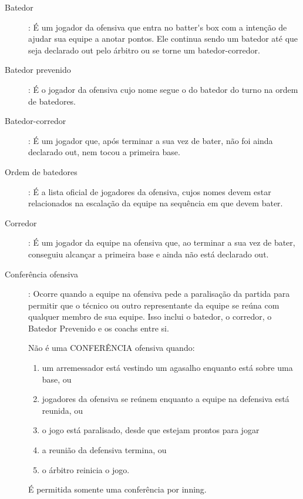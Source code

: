 	\begin{description}
	\item[Batedor]: \'E um jogador da ofensiva que entra no \gls{batter's box} com a inten\c{c}\~ao de ajudar sua equipe a anotar pontos. Ele continua sendo um batedor at\'e que seja declarado \gls{out} pelo \'arbitro ou se torne um batedor-corredor. 
	\item[Batedor prevenido]: \'E o jogador da ofensiva cujo nome segue o do batedor do turno na ordem de batedores. 	
	\item[Batedor-corredor]: \'E um jogador que, ap\'os terminar a sua vez de bater, n\~ao foi ainda declarado \gls{out}, nem tocou a primeira base. 
	
	\item[Ordem de batedores]: \'E a lista oficial de jogadores da ofensiva, cujos nomes devem estar relacionados na escala\c{c}\~ao da equipe na sequ\^encia em que devem bater. 
	
		\item[Corredor]: \'E um jogador da equipe na ofensiva que, ao terminar a sua vez de bater, conseguiu alcan\c{c}ar a primeira base e ainda n\~ao est\'a declarado \gls{out}.

	\item[Confer\^encia ofensiva]: Ocorre quando a equipe na ofensiva pede a paralisa\c{c}\~ao da partida para permitir que o t\'ecnico ou outro representante da equipe se re\'una com qualquer membro de sua equipe. Isso inclui o batedor, o corredor, o Batedor Prevenido e os \glspl{coach} entre si. 
	
	N\~ao \'e uma CONFERÊNCIA ofensiva quando:
	\begin{enumerate}[label=\alph*)]
		\item  um arremessador est\'a vestindo um agasalho enquanto est\'a sobre uma base, ou
		\item jogadores da ofensiva se re\'unem enquanto a equipe na defensiva est\'a reunida, ou 
		\item o jogo est\'a paralisado, desde que estejam prontos para jogar
		\item a reuni\~ao da defensiva termina, ou 
		\item o \'arbitro reinicia o jogo. 
	\end{enumerate}
		\'E permitida somente uma confer\^encia por \gls{inning}. 
	\end{description}

